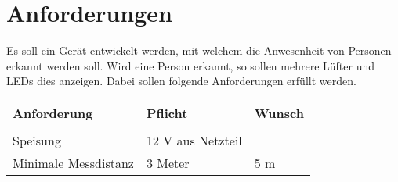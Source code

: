 



\section{Anforderungen}
Es soll ein Gerät entwickelt werden, mit welchem die Anwesenheit von Personen 
erkannt werden soll. Wird eine Person erkannt, so sollen mehrere Lüfter und 
LEDs dies anzeigen. Dabei sollen folgende Anforderungen erfüllt werden. 

\begin{table}[h!]
  \begin{tabular}{@{}p{}p{}p{}}
    \rowcolor{white} \textbf{Anforderung}     & \textbf{Pflicht} & \textbf{Wunsch}\\
                                              &                  &                \\
    \rowcolor{white} Speisung                 & 12 V aus Netzteil&                \\
    \rowcolor{lgray} Minimale Messdistanz     & 3 Meter          & 5 m            \\
  \end{tabular}
  \label{tab:anforderungen}
\end{table}
